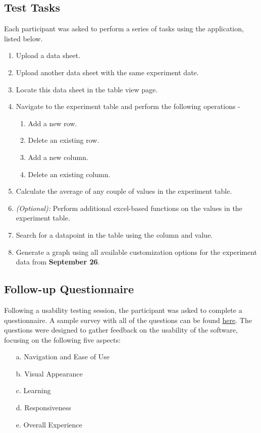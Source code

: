 \documentclass{article}
\begin{document}
\subsection{Test Tasks}
Each participant was asked to perform a series of tasks using the application,
listed below.
\begin{enumerate}
    \item Upload a data sheet. \label{T1}
    \item Upload another data sheet with the same experiment date. \label{T2}
    \item Locate this data sheet in the table view page. \label{T3}
    \item Navigate to the experiment table and perform the following operations - \label{T4}
    \begin{enumerate}
      \item Add a new row.
      \item Delete an existing row.
      \item Add a new column.
      \item Delete an existing column.
    \end{enumerate}
    \item Calculate the average of any couple of values in the experiment table. \label{T5}
    \item \emph{(Optional):} Perform additional excel-based functions on the values in the experiment table.
    \item Search for a datapoint in the table using the column and value. \label{T6}
    \item Generate a graph using all available customization options for the experiment data from \textbf{September 26}. \label{T7}
\end{enumerate}

\subsection{Follow-up Questionnaire}
Following a usability testing session, the participant was asked to complete a
questionnaire. A sample survey with all of the questions can be found
\href{https://github.com/SumanyaG/Alkalytics/blob/main/docs/UsabilityTestingReport/Survey/SampleSurvey.pdf}{here}.
The questions were designed to gather feedback on the usability of the
software, focusing on the following five aspects:
\begin{itemize}
    \item[a.] Navigation and Ease of Use
    \item[b.] Visual Appearance
    \item[c.] Learning
    \item[d.] Responsiveness
    \item[e.] Overall Experience
\end{itemize}
\end{document}
